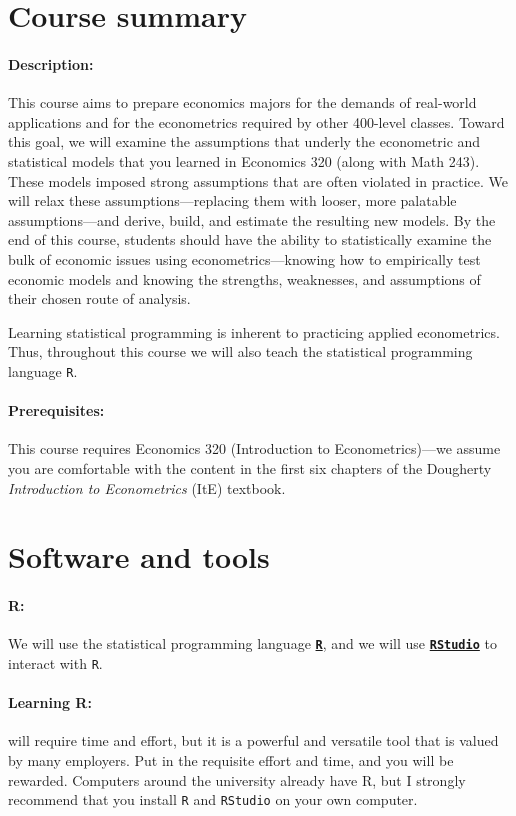 \documentclass[10pt]{article}
\begin{document}
\section*{Course summary}

\paragraph{Description:} This course aims to prepare economics majors for the demands of real-world applications and for the econometrics required by other 400-level classes. Toward this goal, we will examine the assumptions that underly the econometric and statistical models that you learned in Economics 320 (along with Math 243). These models imposed strong assumptions that are often violated in practice. We will relax these assumptions---replacing them with looser, more palatable assumptions---and derive, build, and estimate the resulting new models. By the end of this course, students should have the ability to statistically examine the bulk of economic issues using econometrics---knowing how to empirically test economic models and knowing the strengths, weaknesses, and assumptions of their chosen route of analysis.

Learning statistical programming is inherent to practicing applied econometrics. Thus, throughout this course we will also teach the statistical programming language \texttt{{R}}.

\paragraph{Prerequisites:} This course requires Economics 320 (Introduction to Econometrics)---we assume you are comfortable with the content in the first six chapters of the Dougherty \textit{Introduction to Econometrics} (ItE) textbook.

\section*{Software and tools}

\paragraph{R:} We will use the statistical programming language \href{https://www.r-project.org/}{\textbf{\texttt{R}}}, and we will use \href{https://www.rstudio.com}{\textbf{\texttt{RStudio}}} to interact with \texttt{R}.

\paragraph{Learning R:} will require time and effort, but it is a powerful and versatile tool that is valued by many employers. Put in the requisite effort and time, and you will be rewarded. Computers around the university already have R, but I strongly recommend that you install \texttt{R} and \texttt{RStudio} on your own computer.
\end{document}
